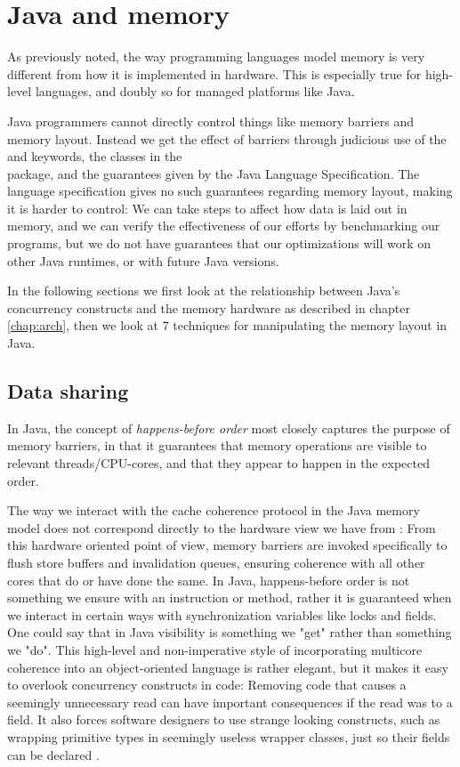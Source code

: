 \chapter{Java and memory}
\label{chap:javamem}

As previously noted, the way programming languages model memory is very
different from how it is implemented in hardware. This is especially true for
high-level languages, and doubly so for managed platforms like Java.

Java programmers cannot directly control things like memory barriers and memory
layout. Instead we get the effect of barriers through judicious use of the
 and  keywords, the classes in the
\\ package, and the guarantees given by
the Java Language Specification\cite{javaspec}.
The language specification gives no such guarantees regarding memory
layout, making it is harder to control: We can take steps to affect how
data is laid out in memory, and we can verify the effectiveness of our efforts
by benchmarking our programs, but we do not have guarantees that our
optimizations will work on other Java runtimes, or with future Java versions.

In the following sections we first look at the relationship between Java's
concurrency constructs and the memory hardware as described in chapter
\ref{chap:arch}, then we look at 7 techniques for manipulating the memory layout
in Java.

\section{Data sharing}
In Java, the concept of \textit{happens-before order} most closely captures the
purpose of memory barriers, in that it guarantees that memory operations are
visible to relevant threads/CPU-cores, and that they appear to happen in the
expected order.

The way we interact with the cache coherence protocol in the Java memory model
does not correspond directly to the hardware view we have from
\cite{mckenny-barriers}: From this hardware oriented point of view, memory
barriers are invoked specifically to flush store buffers and invalidation
queues, ensuring coherence with all other cores that do or have done the same.
In Java, happens-before order is not something we ensure with an instruction or
method, rather it is guaranteed when we interact in certain ways with
synchronization variables like locks and  fields. One could say
that in Java visibility is something we "get" rather than something we "do".
This high-level and non-imperative style of incorporating multicore coherence
into an object-oriented language is rather elegant, but it makes it easy to
overlook concurrency constructs in code: Removing code that causes a seemingly
unnecessary read can have important consequences if the read was to a
 field. It also forces software designers to use strange looking
constructs, such as wrapping primitive types in seemingly useless wrapper
classes, just so their fields can be declared .

